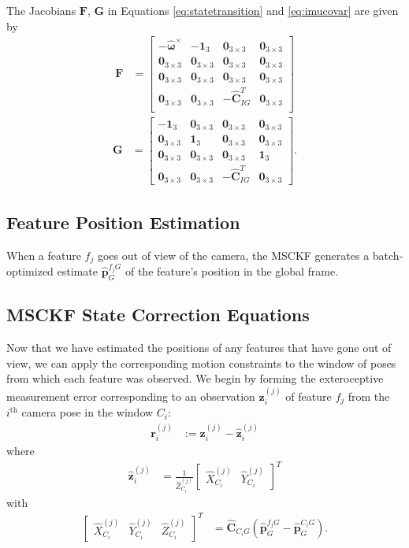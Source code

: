\documentclass[letterpaper, 10 pt, conference]{ieeeconf}  %
\def\Vec#1{\mathbf{#1}}
\newcommand{\bbm}{\begin{bmatrix}}
\newcommand{\ebm}{\end{bmatrix}}
\begin{document}
The Jacobians $\Vec{F}$, $\Vec{G}$ in Equations \ref{eq:statetransition} and \ref{eq:imucovar} are given by
\begin{align}
\Vec{F} &= \bbm -\hat{\boldsymbol{\omega}}^\times & -\Vec{1}_3 & \Vec{0}_{3\times3} & \Vec{0}_{3\times3} \\
                    \Vec{0}_{3\times3} & \Vec{0}_{3\times3} & \Vec{0}_{3\times3} & \Vec{0}_{3\times3} \\
                    \Vec{0}_{3\times3} & \Vec{0}_{3\times3} & \Vec{0}_{3\times3} & \Vec{0}_{3\times3} \\
                    \Vec{0}_{3\times3} & \Vec{0}_{3\times3} & -\hat{\Vec{C}}_{I G}^T & \Vec{0}_{3\times3} \\
            \ebm
\end{align}
\begin{align}
\Vec{G} &=  \bbm    -\Vec{1}_3 & \Vec{0}_{3\times3} & \Vec{0}_{3\times3} & \Vec{0}_{3\times3} \\
                                \Vec{0}_{3\times3} & \Vec{1}_3 & \Vec{0}_{3\times3} & \Vec{0}_{3\times3} \\
                                \Vec{0}_{3\times3} & \Vec{0}_{3\times3} & \Vec{0}_{3\times3} & \Vec{1}_3 \\
                                \Vec{0}_{3\times3} & \Vec{0}_{3\times3} & -\hat{\Vec{C}}_{I G}^T & \Vec{0}_{3\times3}
            \ebm .
\end{align}

\subsection{Feature Position Estimation}
When a feature $f_j$ goes out of view of the camera, the MSCKF generates a batch-optimized estimate $\hat{\Vec{p}}_G^{f_j G}$ of the feature's position in the global frame.

\subsection{MSCKF State Correction Equations}
Now that we have estimated the positions of any features that have gone out of view, we can apply the corresponding motion constraints to the window of poses from which each feature was observed.
We begin by forming the exteroceptive measurement error corresponding to an observation $\Vec{z}_i^{(j)}$ of feature $f_j$ from the $i^\text{th}$ camera pose in the window $C_i$:
\begin{align} \label{eq:residual_def}
    \Vec{r}_i^{(j)} &:= \Vec{z}_i^{(j)} - \hat{\Vec{z}}_i^{(j)}
\end{align}
where
\begin{align}
    \hat{\Vec{z}}_i^{(j)} &= \frac{1}{\hat{Z}^{(j)}_{C_i}} \bbm \hat{X}^{(j)}_{C_i} & \hat{Y}^{(j)}_{C_i} \ebm ^T
\end{align}
with 
\begin{align}
\bbm \hat{X}^{(j)}_{C_i} & \hat{Y}^{(j)}_{C_i} & \hat{Z}^{(j)}_{C_i} \ebm ^T &= \hat{\Vec{C}}_{C_i G} \left( \hat{\Vec{p}}_G^{f_j G} - \hat{\Vec{p}}_G^{C_i G} \right).
\end{align}
\end{document}
